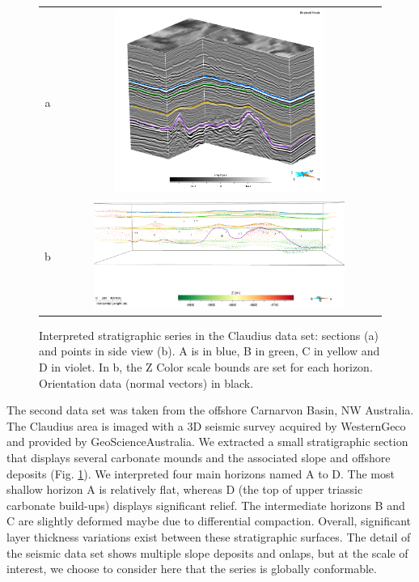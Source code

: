 \documentclass[preprint]{elsarticle}
\begin{document}
\begin{figure}

\centering\begin{tabular}{cc}
a & \includegraphics[width=0.7\textwidth,height=6cm]{Claudius}\\
b & \includegraphics[width=0.8\textwidth]{Claudius1} \\
\end{tabular}
\caption{Interpreted stratigraphic series in the Claudius data set: sections (a) and points in side view (b). A is in blue, B in green, C in yellow and D in violet. In b, the Z Color scale bounds are set for each horizon. Orientation data (normal vectors) in black.}
\label{fig:ClaudiusData}
\end{figure}


The second data set was taken from the offshore Carnarvon Basin, NW Australia. The Claudius area is imaged with a 3D seismic survey acquired by WesternGeco and provided by GeoScienceAustralia. We extracted a small stratigraphic section that displays several carbonate mounds and the associated slope and offshore deposits (Fig. \ref{fig:ClaudiusData}). We interpreted four main horizons named A to D. The most shallow horizon A is relatively flat, whereas D (the top of upper triassic carbonate build-ups) displays significant relief. The intermediate horizons B and C are slightly deformed maybe due to differential compaction. Overall, significant layer thickness variations exist between these stratigraphic surfaces. The detail of the seismic data set shows multiple slope deposits and onlaps, but at the scale of interest, we choose to consider here that the series is globally conformable. 
\end{document}
